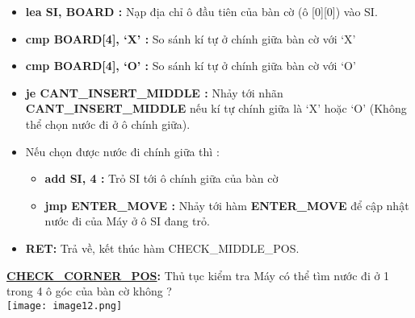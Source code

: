 \begin{itemize}
    \item \textbf{lea SI, BOARD :} Nạp địa chỉ ô đầu tiên của bàn cờ (ô [0][0]) vào SI.
    \item \textbf{cmp BOARD[4], ‘X’ :} So sánh kí tự ở chính giữa bàn cờ với ‘X’
    \item \textbf{cmp BOARD[4], ‘O’ :} So sánh kí tự ở chính giữa bàn cờ với ‘O’
    \item \textbf{je CANT\_INSERT\_MIDDLE :} Nhảy tới nhãn \textbf{CANT\_INSERT\_MIDDLE} nếu kí tự chính giữa là ‘X’ hoặc ‘O’ (Không thể chọn nước đi ở ô chính giữa).
    \item Nếu chọn được nước đi chính giữa thì : 
    \begin{itemize}
        \item \textbf{add SI, 4 :} Trỏ SI tới ô chính giữa của bàn cờ
        \item \textbf{jmp ENTER\_MOVE :} Nhảy tới hàm \textbf{ENTER\_MOVE} để cập nhật nước đi của Máy ở ô SI đang trỏ.
    \end{itemize}
    \item \textbf{RET:} Trả về, kết thúc hàm CHECK\_MIDDLE\_POS. 
\end{itemize}


\textbf{\underline{CHECK\_CORNER\_POS}: }Thủ tục kiểm tra Máy có thể tìm nước đi ở 1 trong 4 ô góc của bàn cờ không ?\\
\texttt{[image: image12.png]}

